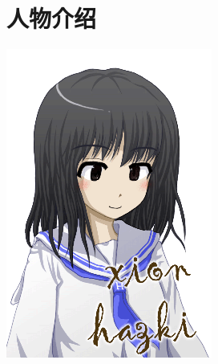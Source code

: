 \chapter[人物介绍]{人物介绍}


% 
% 
\begin{minipage}[b]{0.4\linewidth}

\includegraphics[width=\linewidth]{pngs/aria1.png}

\end{minipage}
